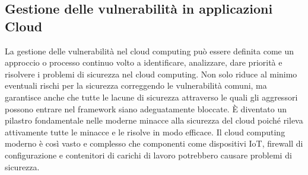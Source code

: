 \subsection{Gestione delle vulnerabilità in applicazioni Cloud}
\cite{gestione_vulnerabiltà}
La gestione delle vulnerabilità nel cloud computing può essere definita come un approccio o processo continuo volto a identificare, analizzare, dare priorità e risolvere i problemi di sicurezza nel cloud computing.
Non solo riduce al minimo eventuali rischi per la sicurezza correggendo le vulnerabilità comuni, ma garantisce anche che tutte le lacune di sicurezza attraverso le quali gli aggressori possono entrare nel framework siano adeguatamente bloccate.
È diventato un pilastro fondamentale nelle moderne minacce alla sicurezza del cloud poiché rileva attivamente tutte le minacce e le risolve in modo efficace. Il cloud computing moderno è così vasto e complesso che componenti come dispositivi IoT, firewall di configurazione e contenitori di carichi di lavoro potrebbero causare problemi di sicurezza.
